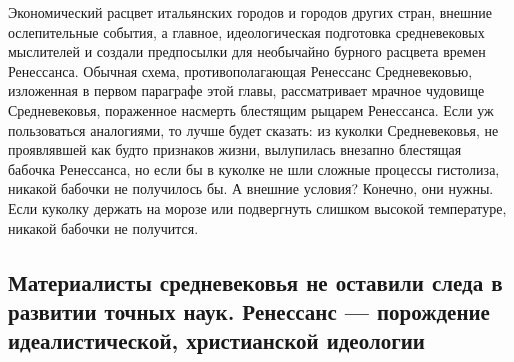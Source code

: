 Экономический  расцвет итальянских  городов  и  городов других  стран,
внешние  ослепительные события,  а главное,  идеологическая подготовка
средневековых мыслителей и создали  предпосылки для необычайно бурного
расцвета времен Ренессанса. Обычная схема, противополагающая Ренессанс
Средневековью, изложенная в первом параграфе этой главы, рассматривает
мрачное чудовище Средневековья,  пораженное насмерть блестящим рыцарем
Ренессанса. Если  уж пользоваться аналогиями, то  лучше будет сказать:
из куколки  Средневековья, не  проявлявшей как будто  признаков жизни,
вылупилась внезапно блестящая бабочка Ренессанса, но если бы в куколке
не шли сложные процессы гистолиза, никакой бабочки не получилось бы. А
внешние условия?  Конечно, они нужны.  Если куколку держать  на морозе
или  подвергнуть  слишком  высокой  температуре,  никакой  бабочки  не
получится.

\subsection{Материалисты  средневековья не  оставили следа  в развитии
точных  наук. Ренессанс  --- порождение  идеалистической, христианской
идеологии}

